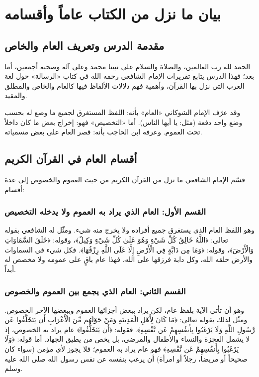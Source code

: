 \chapter{بيان ما نزل من الكتاب عاماً وأقسامه}

\section{مقدمة الدرس وتعريف العام والخاص}
الحمد لله رب العالمين، والصلاة والسلام على نبينا محمد وعلى آله وصحبه أجمعين، أما بعد؛ فهذا الدرس يتابع تقريرات الإمام الشافعي رحمه الله في كتاب «الرسالة» حول لغة العرب التي نزل بها القرآن، وأهمية فهم دلالات الألفاظ فيها كالعام والخاص والمطلق والمقيد.

وقد عرّف الإمام الشوكاني «العام» بأنه: اللفظ المستغرق لجميع ما وضع له بحسب وضع واحد دفعة (مثل: يا أيها الناس). أما «التخصيص» فهو: إخراج بعض ما كان داخلاً تحت العموم. وعرفه ابن الحاجب بأنه: قصر العام على بعض مسمياته.

\section{أقسام العام في القرآن الكريم}
قسّم الإمام الشافعي ما نزل من القرآن الكريم من حيث العموم والخصوص إلى عدة أقسام:

\subsection{القسم الأول: العام الذي يراد به العموم ولا يدخله التخصيص}
وهو اللفظ العام الذي يستغرق جميع أفراده ولا يخرج منه شيء. ومثّل له الشافعي بقوله تعالى: ﴿اللَّهُ خَالِقُ كُلِّ شَيْءٍ وَهُوَ عَلَىٰ كُلِّ شَيْءٍ وَكِيلٌ﴾، وقوله: ﴿خَلَقَ السَّمَاوَاتِ وَالْأَرْضَ﴾، وقوله: ﴿وَمَا مِن دَابَّةٍ فِي الْأَرْضِ إِلَّا عَلَى اللَّهِ رِزْقُهَا﴾. فكل شيء في السماوات والأرض خلقه الله، وكل دابة فرزقها على الله، فهذا عام باقٍ على عمومه ولا مخصص له أبداً.

\subsection{القسم الثاني: العام الذي يجمع بين العموم والخصوص}
وهو أن تأتي الآية بلفظ عام، لكن يراد ببعض أجزائها العموم وببعضها الآخر الخصوص. ومثّل لذلك بقوله تعالى: ﴿مَا كَانَ لِأَهْلِ الْمَدِينَةِ وَمَنْ حَوْلَهُم مِّنَ الْأَعْرَابِ أَن يَتَخَلَّفُوا عَن رَّسُولِ اللَّهِ وَلَا يَرْغَبُوا بِأَنفُسِهِمْ عَن نَّفْسِهِ﴾. 
فقوله: ﴿أَن يَتَخَلَّفُوا﴾ عام يراد به الخصوص، إذ لا يشمل العجزة والنساء والأطفال والمرضى، بل يخص من يطيق الجهاد. أما قوله: ﴿وَلَا يَرْغَبُوا بِأَنفُسِهِمْ عَن نَّفْسِهِ﴾ فهو عام يراد به العموم؛ فلا يجوز لأي مؤمن (سواء كان صحيحاً أو مريضا، رجلاً أو امرأة) أن يرغب بنفسه عن نفس رسول الله صلى الله عليه وسلم.

